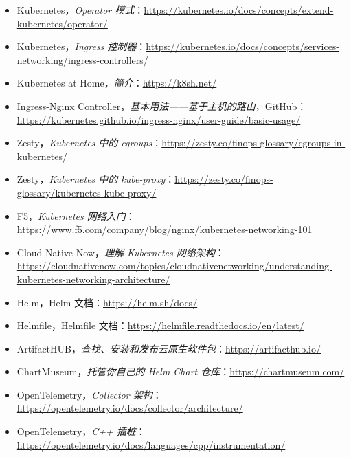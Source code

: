 \begin{itemize}
\item Kubernetes，\emph{Operator 模式}：\href{https://kubernetes.io/docs/concepts/extend-kubernetes/operator/}{https://kubernetes.io/docs/concepts/extend-kubernetes/operator/}
\item Kubernetes，\emph{Ingress 控制器}：\href{https://kubernetes.io/docs/concepts/services-networking/ingress-controllers/}{https://kubernetes.io/docs/concepts/services-networking/ingress-controllers/}
\item Kubernetes at Home，\emph{简介}：\href{https://k8sh.net/}{https://k8sh.net/}
\item Ingress-Nginx Controller，\emph{基本用法——基于主机的路由}，GitHub：\href{https://kubernetes.github.io/ingress-nginx/user-guide/basic-usage/}{https://kubernetes.github.io/ingress-nginx/user-guide/basic-usage/}
\item Zesty，\emph{Kubernetes 中的 cgroups}：\href{https://zesty.co/finops-glossary/cgroups-in-kubernetes/ }{https://zesty.co/finops-glossary/cgroups-in-kubernetes/}
\item Zesty，\emph{Kubernetes 中的 kube-proxy}：\href{https://zesty.co/finops-glossary/kubernetes-kube-proxy/}{https://zesty.co/finops-glossary/kubernetes-kube-proxy/}
\item F5，\emph{Kubernetes 网络入门}：\href{https://www.f5.com/company/blog/nginx/kubernetes-networking-101}{https://www.f5.com/company/blog/nginx/kubernetes-networking-101}
\item Cloud Native Now，\emph{理解 Kubernetes 网络架构}：\href{https://cloudnativenow.com/topics/cloudnativenetworking/understanding-kubernetes-networking-architecture/}{https://cloudnativenow.com/topics/cloudnativenetworking/understanding-kubernetes-networking-architecture/}
\item Helm，Helm 文档：\href{https://helm.sh/docs/}{https://helm.sh/docs/}
\item Helmfile，Helmfile 文档：\href{https://helmfile.readthedocs.io/en/latest/}{https://helmfile.readthedocs.io/en/latest/}
\item ArtifactHUB，\emph{查找、安装和发布云原生软件包}：\href{https://artifacthub.io/}{https://artifacthub.io/}
\item ChartMuseum，\emph{托管你自己的 Helm Chart 仓库}：\href{https://chartmuseum.com/}{https://chartmuseum.com/}
\item OpenTelemetry，\emph{Collector 架构}：\href{https://opentelemetry.io/docs/collector/architecture/}{https://opentelemetry.io/docs/collector/architecture/}
\item OpenTelemetry，\emph{C++ 插桩}：\href{https://opentelemetry.io/docs/languages/cpp/instrumentation/}{https://opentelemetry.io/docs/languages/cpp/instrumentation/}

\end{itemize}
